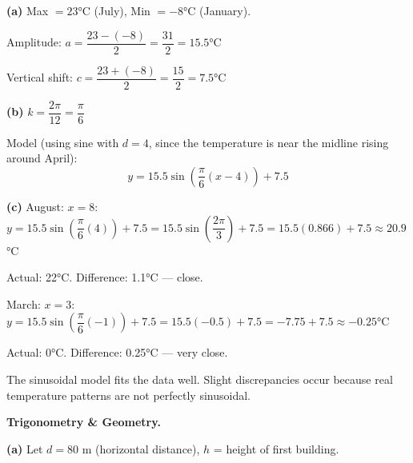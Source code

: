 \documentclass[addpoints]{exam}
\begin{document}
\begin{questions}
\begin{solution}[10cm]
\textbf{(a)} Max $= 23$°C (July), Min $= -8$°C (January).

Amplitude: $a = \dfrac{23-(-8)}{2} = \dfrac{31}{2} = \mathbf{15.5}$°C

Vertical shift: $c = \dfrac{23+(-8)}{2} = \dfrac{15}{2} = \mathbf{7.5}$°C

\textbf{(b)} $k = \dfrac{2\pi}{12} = \dfrac{\pi}{6}$

Model (using sine with $d = 4$, since the temperature is near the midline rising around April):
\[y = 15.5\sin\!\left(\dfrac{\pi}{6}(x - 4)\right) + 7.5\]

\textbf{(c)} August: $x = 8$:\quad $y = 15.5\sin\!\left(\dfrac{\pi}{6}(4)\right) + 7.5 = 15.5\sin\!\left(\dfrac{2\pi}{3}\right) + 7.5 = 15.5(0.866) + 7.5 \approx \mathbf{20.9}$°C

Actual: 22°C. Difference: 1.1°C — close.

March: $x = 3$:\quad $y = 15.5\sin\!\left(\dfrac{\pi}{6}(-1)\right) + 7.5 = 15.5(-0.5) + 7.5 = -7.75 + 7.5 \approx \mathbf{-0.25}$°C

Actual: 0°C. Difference: 0.25°C — very close.

The sinusoidal model fits the data well. Slight discrepancies occur because real temperature patterns are not perfectly sinusoidal.
\end{solution}

\question[8] \textbf{Trigonometry \& Geometry.}
\begin{solution}[11cm]
\textbf{(a)} Let $d = 80$ m (horizontal distance), $h$ = height of first building.


\end{solution}
\end{questions}
\end{document}
